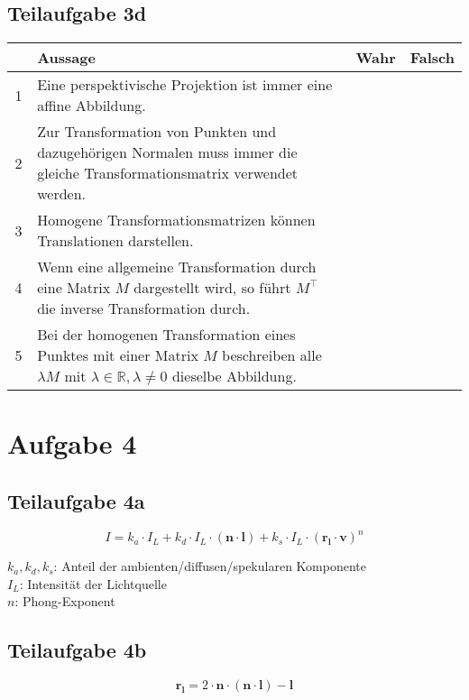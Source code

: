 \documentclass[a4paper]{scrartcl}
\begin{document}
\subsection*{Teilaufgabe 3d}
\begin{tabular}{cp{12cm}ll}\toprule
	~ & \textbf{Aussage} & \textbf{Wahr} & \textbf{Falsch} \\\midrule
	1 & Eine perspektivische Projektion ist immer eine affine Abbildung.
	  & \Square     & \CheckedBox \\
	2 & Zur Transformation von Punkten und dazugehörigen Normalen muss immer die gleiche Transformationsmatrix verwendet werden.
	  & \Square     & \CheckedBox \\
	3 & Homogene Transformationsmatrizen können Translationen darstellen.
	  & \CheckedBox & \Square     \\
	4 & Wenn eine allgemeine Transformation durch eine Matrix $M$ dargestellt wird, so führt $M^\top$ die inverse Transformation durch.
	  & \Square     & \CheckedBox \\
	5 & Bei der homogenen Transformation eines Punktes mit einer Matrix $M$ beschreiben alle $\lambda M$ mit $\lambda \in \mathbb{R}, \lambda \ne 0$ dieselbe Abbildung.
	  & \CheckedBox & \Square     \\\bottomrule
\end{tabular}

\section*{Aufgabe 4}
\subsection*{Teilaufgabe 4a}
\[I = k_a \cdot I_L + k_d \cdot I_L \cdot (\mathbf{n} \cdot \mathbf{l}) + k_s \cdot I_L \cdot (\mathbf{r_l} \cdot \mathbf{v})^n\]

$k_a, k_d, k_s$: Anteil der ambienten/diffusen/spekularen Komponente\\
$I_L$: Intensität der Lichtquelle\\
$n$: Phong-Exponent

\subsection*{Teilaufgabe 4b}
\[\mathbf{r_l} = 2 \cdot \mathbf{n} \cdot (\mathbf{n} \cdot \mathbf{l}) - \mathbf{l}\]
\end{document}
